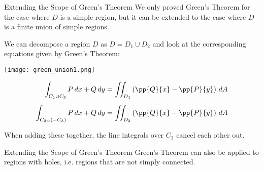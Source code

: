 \documentclass[11pt,english,
handout
]{beamer}
\begin{document}
\begin{frame}[t]{Extending the Scope of Green's Theorem}
\small
We only proved Green's Theorem for the case where $D$ is a simple region, but it can be extended to the case where $D$ is a finite union of simple regions.\pause 

We can decompose a region $D$ as $D=D_1 \cup D_2$ and look at the corresponding equations given by Green's Theorem:

\begin{minipage}{0.34\textwidth}
\centering
\texttt{[image: green\_union1.png]}
\end{minipage}\hspace{10mm}%
\begin{minipage}{0.56\textwidth}
\scriptsize
\begin{align*}
\int_{C_1\cup C_3}P\,dx+Q\,dy&=\iint_{D_1}\left(\pp{Q}{x}-\pp{P}{y}\right)\,dA\\[2mm]
\int_{C_2\cup (-C_3)}P\,dx+Q\,dy&=\iint_{D_2}\left(\pp{Q}{x}-\pp{P}{y}\right)\,dA\\
\end{align*}
\end{minipage}\pause

\lspace
When adding these together, the line integrals over $C_3$ cancel each other out.
\end{frame}












\begin{frame}[t]{Extending the Scope of Green's Theorem}
\small
Green's Theorem can also be applied to regions with holes, i.e. regions that are not simply connected.  



\end{frame}
\end{document}
